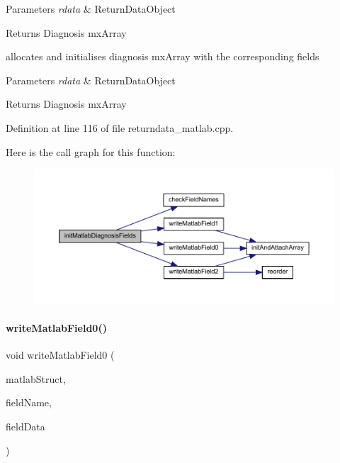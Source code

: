\begin{DoxyParams}{Parameters}
{\em rdata} & Return\+Data\+Object\\
\hline
\end{DoxyParams}
\begin{DoxyReturn}{Returns}
Diagnosis mx\+Array
\end{DoxyReturn}
allocates and initialises diagnosis mx\+Array with the corresponding fields


\begin{DoxyParams}{Parameters}
{\em rdata} & Return\+Data\+Object\\
\hline
\end{DoxyParams}
\begin{DoxyReturn}{Returns}
Diagnosis mx\+Array
\end{DoxyReturn}


Definition at line 116 of file returndata\+\_\+matlab.\+cpp.

Here is the call graph for this function\+:
\nopagebreak
\begin{figure}[H]
\begin{center}
\leavevmode
\includegraphics[width=350pt]{namespaceamici_aa12d4917fed647a1edeaaa26a261c770_cgraph}
\end{center}
\end{figure}
\mbox{\label{namespaceamici_ad2949f3931c6fac6fd12fd7ede47ac30}} 
\paragraph{\texorpdfstring{writeMatlabField0()}{writeMatlabField0()}}
{\footnotesize\ttfamily void write\+Matlab\+Field0 (\begin{DoxyParamCaption}\item[{mx\+Array $\ast$}]{matlab\+Struct,  }\item[{const char $\ast$}]{field\+Name,  }\item[{T}]{field\+Data }\end{DoxyParamCaption})}

